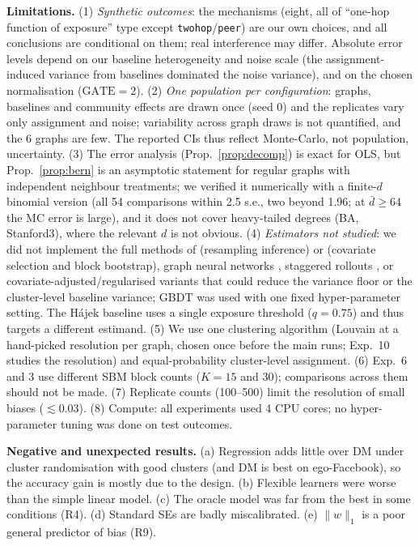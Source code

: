 \textbf{Limitations.} (1) \emph{Synthetic outcomes}: the mechanisms (eight, all of ``one-hop function of exposure'' type except \texttt{twohop}/\texttt{peer}) are our own choices, and all conclusions are conditional on them; real interference may differ. Absolute error levels depend on our baseline heterogeneity and noise scale (the assignment-induced variance from baselines dominated the noise variance), and on the chosen normalisation ($\mathrm{GATE}=2$). (2) \emph{One population per configuration}: graphs, baselines and community effects are drawn once (seed 0) and the replicates vary only assignment and noise; variability across graph draws is not quantified, and the 6 graphs are few. The reported CIs thus reflect Monte-Carlo, not population, uncertainty. (3) The error analysis (Prop.~\ref{prop:decomp}) is exact for OLS, but Prop.~\ref{prop:bern} is an asymptotic statement for regular graphs with independent neighbour treatments; we verified it numerically with a finite-$d$ binomial version (all 54 comparisons within 2.5 s.e., two beyond 1.96; at $\bar d\ge64$ the MC error is large), and it does not cover heavy-tailed degrees (BA, Stanford3), where the relevant $d$ is not obvious. (4) \emph{Estimators not studied}: we did not implement the full methods of \citet{chin2019} (resampling inference) or \citet{han2023} (covariate selection and block bootstrap), graph neural networks \citep{kipf2017}, staggered rollouts \citep{cortez2022}, or covariate-adjusted/regularised variants that could reduce the variance floor or the cluster-level baseline variance; GBDT was used with one fixed hyper-parameter setting. The H\'ajek baseline uses a single exposure threshold ($q{=}0.75$) and thus targets a different estimand. (5) We use one clustering algorithm (Louvain at a hand-picked resolution per graph, chosen once before the main runs; Exp.~10 studies the resolution) and equal-probability cluster-level assignment. (6) Exp.~6 and 3 use different SBM block counts ($K{=}15$ and $30$); comparisons across them should not be made. (7) Replicate counts (100--500) limit the resolution of small biases ($\lesssim0.03$). (8) Compute: all experiments used 4 CPU cores; no hyper-parameter tuning was done on test outcomes.

\textbf{Negative and unexpected results.} (a) Regression adds little over DM under cluster randomisation with good clusters (and DM is best on ego-Facebook), so the accuracy gain is mostly due to the design. (b) Flexible learners were worse than the simple linear model. (c) The oracle model was far from the best in some conditions (R4). (d) Standard SEs are badly miscalibrated. (e) $\|w\|_1$ is a poor general predictor of bias (R9).
